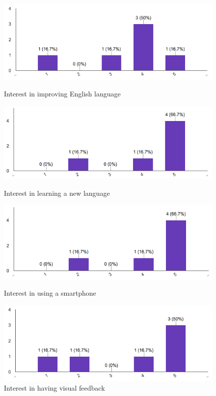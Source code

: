 \begin{figure}[!ht]
	\centering
	\begin{minipage}{.5\textwidth}
		\centering
		\includegraphics[scale=0.5]{Figures/responses/interest_improving_lang.png}
		\caption{Interest in improving English language}
		\label{fig:int_improving_lang}
	\end{minipage}%
	\begin{minipage}{.5\textwidth}
		\centering
		\includegraphics[scale=0.5]{Figures/responses/interest_learning_language.png}
		\caption{Interest in learning a new language}
		\label{fig:int_learnign_lang}
	\end{minipage}
    \begin{minipage}{.5\textwidth}
        \centering
        \includegraphics[scale=0.5]{Figures/responses/interest_usage_smartphone.png}
        \caption{Interest in using a smartphone}
        \label{fig:int_usage_smartphone}
    \end{minipage}%
	\begin{minipage}{.5\textwidth}
		\centering
		\includegraphics[scale=0.5]{Figures/responses/interest_visual_feedback.png}
		\caption{Interest in having visual feedback}
		\label{fig:int_visual_feedbak}
	\end{minipage}%
\end{figure}

